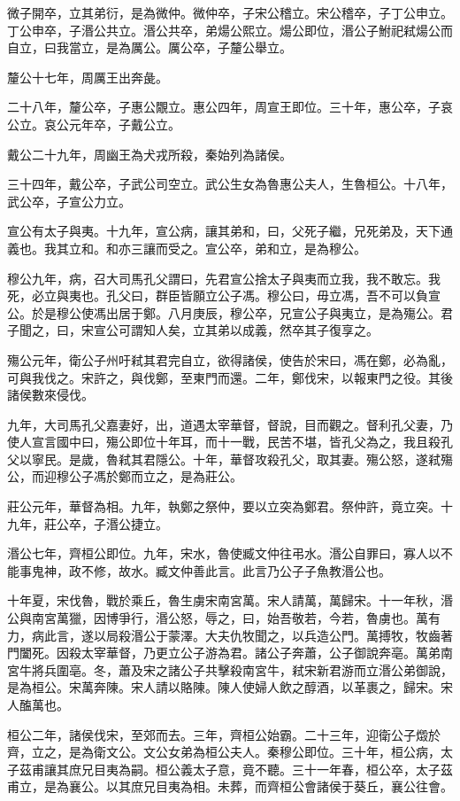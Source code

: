 微子開卒，立其弟衍，是為微仲。微仲卒，子宋公稽立。宋公稽卒，子丁公申立。丁公申卒，子湣公共立。湣公共卒，弟煬公熙立。煬公即位，湣公子鮒祀弒煬公而自立，曰我當立，是為厲公。厲公卒，子釐公舉立。

釐公十七年，周厲王出奔彘。

二十八年，釐公卒，子惠公覵立。惠公四年，周宣王即位。三十年，惠公卒，子哀公立。哀公元年卒，子戴公立。

戴公二十九年，周幽王為犬戎所殺，秦始列為諸侯。

三十四年，戴公卒，子武公司空立。武公生女為魯惠公夫人，生魯桓公。十八年，武公卒，子宣公力立。

宣公有太子與夷。十九年，宣公病，讓其弟和，曰，父死子繼，兄死弟及，天下通義也。我其立和。和亦三讓而受之。宣公卒，弟和立，是為穆公。

穆公九年，病，召大司馬孔父謂曰，先君宣公捨太子與夷而立我，我不敢忘。我死，必立與夷也。孔父曰，群臣皆願立公子馮。穆公曰，毋立馮，吾不可以負宣公。於是穆公使馮出居于鄭。八月庚辰，穆公卒，兄宣公子與夷立，是為殤公。君子聞之，曰，宋宣公可謂知人矣，立其弟以成義，然卒其子復享之。

殤公元年，衛公子州吁弒其君完自立，欲得諸侯，使告於宋曰，馮在鄭，必為亂，可與我伐之。宋許之，與伐鄭，至東門而還。二年，鄭伐宋，以報東門之役。其後諸侯數來侵伐。

九年，大司馬孔父嘉妻好，出，道遇太宰華督，督說，目而觀之。督利孔父妻，乃使人宣言國中曰，殤公即位十年耳，而十一戰，民苦不堪，皆孔父為之，我且殺孔父以寧民。是歲，魯弒其君隱公。十年，華督攻殺孔父，取其妻。殤公怒，遂弒殤公，而迎穆公子馮於鄭而立之，是為莊公。

莊公元年，華督為相。九年，執鄭之祭仲，要以立突為鄭君。祭仲許，竟立突。十九年，莊公卒，子湣公捷立。

湣公七年，齊桓公即位。九年，宋水，魯使臧文仲往弔水。湣公自罪曰，寡人以不能事鬼神，政不修，故水。臧文仲善此言。此言乃公子子魚教湣公也。

十年夏，宋伐魯，戰於乘丘，魯生虜宋南宮萬。宋人請萬，萬歸宋。十一年秋，湣公與南宮萬獵，因博爭行，湣公怒，辱之，曰，始吾敬若，今若，魯虜也。萬有力，病此言，遂以局殺湣公于蒙澤。大夫仇牧聞之，以兵造公門。萬搏牧，牧齒著門闔死。因殺太宰華督，乃更立公子游為君。諸公子奔蕭，公子御說奔亳。萬弟南宮牛將兵圍亳。冬，蕭及宋之諸公子共擊殺南宮牛，弒宋新君游而立湣公弟御說，是為桓公。宋萬奔陳。宋人請以賂陳。陳人使婦人飲之醇酒，以革裹之，歸宋。宋人醢萬也。

桓公二年，諸侯伐宋，至郊而去。三年，齊桓公始霸。二十三年，迎衛公子燬於齊，立之，是為衛文公。文公女弟為桓公夫人。秦穆公即位。三十年，桓公病，太子茲甫讓其庶兄目夷為嗣。桓公義太子意，竟不聽。三十一年春，桓公卒，太子茲甫立，是為襄公。以其庶兄目夷為相。未葬，而齊桓公會諸侯于葵丘，襄公往會。

